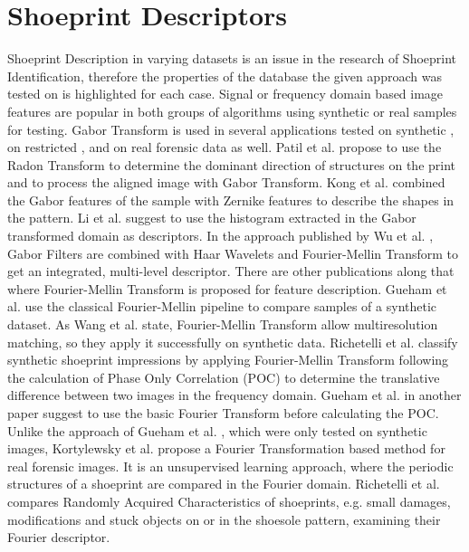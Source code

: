 \documentclass[draft,final]{vutinfth} %
\begin{document}
\section*{Shoeprint Descriptors}
\par
Shoeprint Description in varying datasets is an issue in the research of Shoeprint Identification, therefore the properties of the database the given approach was tested on is highlighted for each case.
Signal or frequency domain based image features are popular in both groups of algorithms using synthetic or real samples for testing.
Gabor Transform is used in several applications tested on synthetic \cite{patil2009rotation}, on restricted \cite{kong2014novel}, \cite{li2014retrieval} and on real forensic data \cite{wu2019crime} as well.
Patil et al. \cite{patil2009rotation} propose to use the Radon Transform to determine the dominant direction of structures on the print and to process the aligned image with Gabor Transform.
Kong et al.  \cite{kong2014novel} combined the Gabor features of the sample with Zernike features to describe the shapes in the pattern.
Li et al. \cite{li2014retrieval} suggest to use the histogram extracted in the Gabor transformed domain as descriptors.
In the approach published by Wu et al.  \cite{wu2019crime}, Gabor Filters are combined with Haar Wavelets and Fourier-Mellin Transform to get an integrated, multi-level descriptor. 
There are other publications along that where Fourier-Mellin Transform is proposed for feature description.
Gueham et al. \cite{gueham2008automatic} use the classical Fourier-Mellin pipeline to compare samples of a synthetic dataset.
As Wang et al. \cite{wang2014automatic} state, Fourier-Mellin Transform allow multiresolution matching, so they apply it successfully on synthetic data.
Richetelli et al. \cite{richetelli2017classification} classify synthetic shoeprint impressions by applying Fourier-Mellin Transform following the calculation of Phase Only Correlation (POC) to determine the translative difference between two images in the frequency domain.
Gueham et al. \cite{gueham2007automatic} in another paper suggest to use the basic Fourier Transform before calculating the POC.
Unlike the approach of Gueham et al. \cite{gueham2007automatic}, which were only tested on synthetic images, Kortylewsky et al. \cite{kortylewski2014unsupervised} propose a Fourier Transformation based method for real forensic images.
It is an unsupervised learning approach, where the periodic structures of a shoeprint are compared in the Fourier domain.
Richetelli et al. \cite{richetelli2017quantitative} compares Randomly Acquired Characteristics of shoeprints, e.g. small damages, modifications and stuck objects on or in the shoesole pattern, examining their Fourier descriptor.
\end{document}
